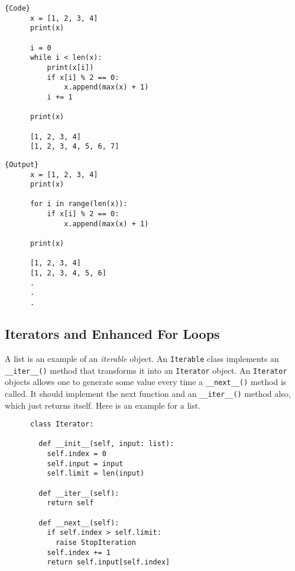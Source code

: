 \documentclass{article}
\begin{document}
    \noindent\begin{minipage}{.5\textwidth}
    \begin{lstlisting}[]{Code}
      x = [1, 2, 3, 4] 
      print(x)

      i = 0 
      while i < len(x): 
          print(x[i])
          if x[i] % 2 == 0: 
              x.append(max(x) + 1) 
          i += 1

      print(x)

      [1, 2, 3, 4]
      [1, 2, 3, 4, 5, 6, 7] 
    \end{lstlisting}
    \end{minipage}
    \hfill
    \begin{minipage}{.49\textwidth}
    \begin{lstlisting}[]{Output}
      x = [1, 2, 3, 4]
      print(x)

      for i in range(len(x)): 
          if x[i] % 2 == 0: 
              x.append(max(x) + 1) 

      print(x)

      [1, 2, 3, 4]
      [1, 2, 3, 4, 5, 6]
      .
      .
      .
    \end{lstlisting}
    \end{minipage}

  \subsection{Iterators and Enhanced For Loops}

    A list is an example of an \textit{iterable} object. An \texttt{Iterable} class implements an \texttt{\_\_iter\_\_()} method that transforms it into an \texttt{Iterator} object. An \texttt{Iterator} objects allows one to generate some value every time a \texttt{\_\_next\_\_()} method is called. It should implement the next function and an \texttt{\_\_iter\_\_()} method also, which just returns itself. Here is an example for a list. 

    \begin{lstlisting}
      class Iterator: 

        def __init__(self, input: list): 
          self.index = 0 
          self.input = input
          self.limit = len(input)

        def __iter__(self): 
          return self

        def __next__(self): 
          if self.index > self.limit: 
            raise StopIteration
          self.index += 1 
          return self.input[self.index]
    \end{lstlisting}
\end{document}
